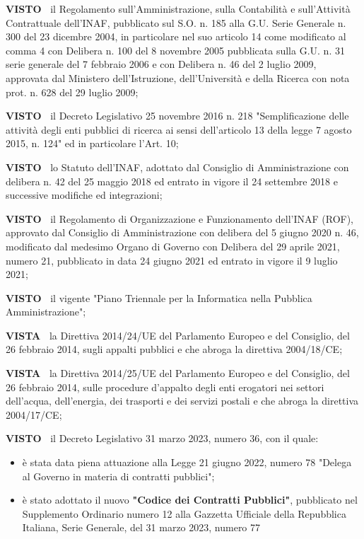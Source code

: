 \textbf{VISTO~}	il Regolamento sull'Amministrazione, sulla Contabilità
e sull'Attività Contrattuale dell'INAF, pubblicato sul S.O. n. 185
alla G.U. Serie Generale n. 300 del 23 dicembre 2004, in particolare
nel suo articolo 14 come modificato al comma 4 con Delibera n. 100
del 8 novembre 2005 pubblicata sulla G.U. n. 31 serie generale del
7 febbraio 2006 e con Delibera n. 46 del 2 luglio 2009, approvata dal
Ministero dell'Istruzione, dell'Università e della Ricerca con nota
prot. n. 628 del 29 luglio 2009;

\textbf{VISTO~}	il Decreto Legislativo 25 novembre 2016 n. 218
"Semplificazione delle attività degli enti pubblici di ricerca ai
sensi dell'articolo 13 della legge 7 agosto 2015, n. 124" ed in
particolare l'Art. 10;

\textbf{VISTO~}	lo Statuto dell'INAF, adottato dal Consiglio di
Amministrazione con delibera n. 42 del 25 maggio 2018 ed entrato in
vigore il 24 settembre 2018 e successive modifiche ed integrazioni;

\textbf{VISTO~}	 il Regolamento di Organizzazione e Funzionamento
dell'INAF (ROF), approvato dal Consiglio di Amministrazione con delibera
del 5 giugno 2020 n. 46, modificato dal medesimo Organo di Governo con
Delibera del 29 aprile 2021, numero 21, pubblicato in data 24 giugno
2021 ed entrato in vigore il 9 luglio 2021;

\textbf{VISTO~}	il vigente "Piano Triennale per la Informatica nella Pubblica
Amministrazione";

\textbf{VISTA~}	la Direttiva 2014/24/UE del Parlamento Europeo e del
Consiglio, del 26 febbraio 2014, sugli appalti pubblici e che abroga la
direttiva 2004/18/CE;  

\textbf{VISTA~}	la Direttiva 2014/25/UE del Parlamento Europeo e del
Consiglio, del 26 febbraio 2014, sulle procedure d'appalto degli enti
erogatori nei settori dell'acqua, dell'energia, dei trasporti e dei
servizi postali e che abroga la direttiva 2004/17/CE; 

\textbf{VISTO~}	il Decreto Legislativo 31 marzo 2023, numero 36, con il
quale:
\begin{itemize}

\item  è stata data piena attuazione alla Legge 21 giugno 2022,
numero 78 "Delega al Governo in materia di contratti pubblici";

\item è stato adottato il nuovo \textbf{"Codice dei Contratti Pubblici"},
    pubblicato nel Supplemento Ordinario numero 12 alla Gazzetta Ufficiale
    della Repubblica Italiana, Serie Generale, del 31 marzo 2023, numero 77
\end{itemize}

